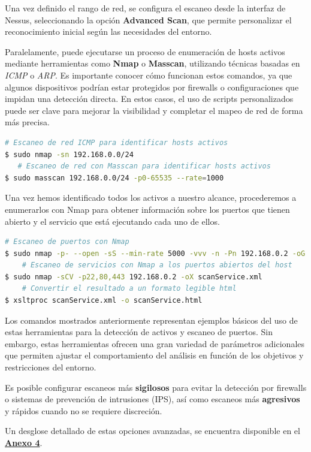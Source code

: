 \documentclass[a4paper, 11pt]{article}
\begin{document}
Una vez definido el rango de red, se configura el escaneo desde la interfaz de Nessus, seleccionando la opción \textbf{Advanced Scan}, que permite personalizar el reconocimiento inicial según las necesidades del entorno.
\par\vspace{0.5cm}

Paralelamente, puede ejecutarse un proceso de enumeración de hosts activos mediante herramientas como \textbf{Nmap} o \textbf{Masscan}, utilizando técnicas basadas en \textit{ICMP} o \textit{ARP}. Es importante conocer cómo funcionan estos comandos, ya que algunos dispositivos podrían estar protegidos por firewalls o configuraciones que impidan una detección directa. En estos casos, el uso de scripts personalizados puede ser clave para mejorar la visibilidad y completar el mapeo de red de forma más precisa.

\par\vspace{0.5cm}

\begin{lstlisting}[language=bash, style=terminalstyle, caption=Escaneo de activos en la red]
    # Escaneo de red ICMP para identificar hosts activos
$ sudo nmap -sn 192.168.0.0/24
   # Escaneo de red con Masscan para identificar hosts activos 
$ sudo masscan 192.168.0.0/24 -p0-65535 --rate=1000
\end{lstlisting}


Una vez hemos identificado todos los activos a nuestro alcance, procederemos a enumerarlos con Nmap para obtener información sobre los puertos que tienen abierto y el servicio que está ejecutando cada uno de ellos.

\begin{lstlisting}[language=bash, style=terminalstyle, caption=Escaneo de puertos y servicios con Nmap]
    # Escaneo de puertos con Nmap
$ sudo nmap -p- --open -sS --min-rate 5000 -vvv -n -Pn 192.168.0.2 -oG allPorts
    # Escaneo de servicios con Nmap a los puertos abiertos del host
$ sudo nmap -sCV -p22,80,443 192.168.0.2 -oX scanService.xml
    # Convertir el resultado a un formato legible html
$ xsltproc scanService.xml -o scanService.html
\end{lstlisting}



Los comandos mostrados anteriormente representan ejemplos básicos del uso de estas herramientas para la detección de activos y escaneo de puertos. Sin embargo, estas herramientas ofrecen una gran variedad de parámetros adicionales que permiten ajustar el comportamiento del análisis en función de los objetivos y restricciones del entorno.
\par\vspace{0.5cm}
Es posible configurar escaneos más \textbf{sigilosos} para evitar la detección por firewalls o sistemas de prevención de intrusiones (IPS), así como escaneos más \textbf{agresivos} y rápidos cuando no se requiere discreción.
\par\vspace{0.5cm}
Un desglose detallado de estas opciones avanzadas, se encuentra disponible en el \hyperref[anexo:4]{\textbf{Anexo 4}}.
\end{document}
